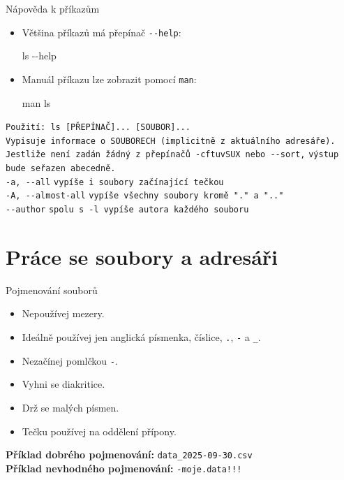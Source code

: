 \documentclass{beamer}
\begin{document}
\begin{frame}{Nápověda k příkazům}
  \begin{itemize}
    \item Většina příkazů má přepínač \texttt{-{}-help}:
    \begin{semiverbatim}
ls -{}-help
    \end{semiverbatim}
    \item Manuál příkazu lze zobrazit pomocí \texttt{man}:
    \begin{semiverbatim}
man ls
    \end{semiverbatim}
  \end{itemize}

\small
\texttt{Použití: ls [PŘEPÍNAČ]... [SOUBOR]...}\\
\texttt{Vypisuje informace o SOUBORECH (implicitně z aktuálního adresáře).}\\
\texttt{Jestliže není zadán žádný z přepínačů -cftuvSUX nebo -{}-sort,}
\texttt{výstup bude seřazen abecedně.}\\[0.5em]
\texttt{-a, -{}-all} \hspace{1em} \texttt{vypíše i soubory začínající tečkou}\\
\texttt{-A, -{}-almost-all} \hspace{1em} \texttt{vypíše všechny soubory kromě "." a ".."}\\
\hspace{1em} \texttt{-{}-author} \hspace{1em} \texttt{spolu s -l vypíše autora každého souboru}
\end{frame}

\section{Práce se soubory a adresáři}
    \begin{frame}{Pojmenování souborů}
        \begin{itemize}
          \item Nepoužívej mezery.
          \item Ideálně používej jen anglická písmenka, číslice, \texttt{.}, \texttt{-} a \texttt{\_}.
          \item Nezačínej pomlčkou \texttt{-}.
          \item Vyhni se diakritice.
          \item Drž se malých písmen.
          \item Tečku používej na oddělení přípony.
        \end{itemize}

            \vspace{1.5em}
    \textbf{Příklad dobrého pojmenování:} \texttt{data\_2025-09-30.csv} \\
    \textbf{Příklad nevhodného pojmenování:} \texttt{-moje.data!!!}
\end{frame}
\end{document}

